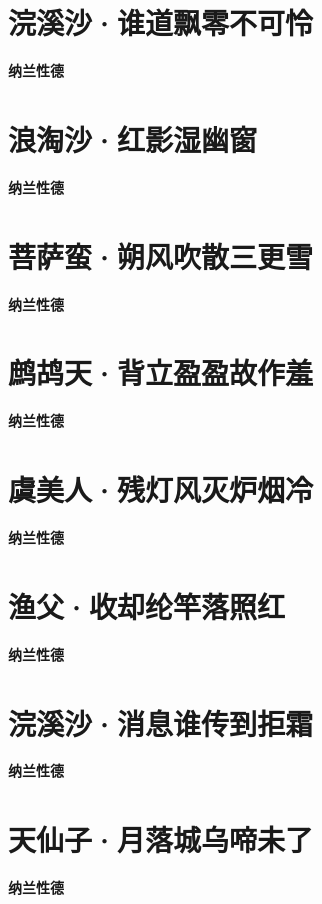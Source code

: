 \documentclass[12pt,a4paper]{ctexbook}
\begin{document}
\section{浣溪沙·谁道飘零不可怜}
\textbf{纳兰性德}\par\vspace{0.5em}

\section{浪淘沙·红影湿幽窗}
\textbf{纳兰性德}\par\vspace{0.5em}

\section{菩萨蛮·朔风吹散三更雪}
\textbf{纳兰性德}\par\vspace{0.5em}

\section{鹧鸪天·背立盈盈故作羞}
\textbf{纳兰性德}\par\vspace{0.5em}

\section{虞美人·残灯风灭炉烟冷}
\textbf{纳兰性德}\par\vspace{0.5em}

\section{渔父·收却纶竿落照红}
\textbf{纳兰性德}\par\vspace{0.5em}

\section{浣溪沙·消息谁传到拒霜}
\textbf{纳兰性德}\par\vspace{0.5em}

\section{天仙子·月落城乌啼未了}
\textbf{纳兰性德}\par\vspace{0.5em}
\end{document}
